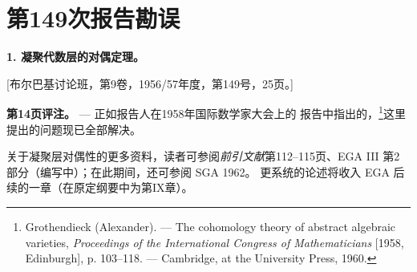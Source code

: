 \clearpage
\chapter*{第149次报告勘误}
\setcounter{footnote}{0}

\noindent\textbf{1. 凝聚代数层的对偶定理。}

\begin{center}
[布尔巴基讨论班，第9卷，1956/57年度，第149号，25页。]
\end{center}

\noindent\textbf{第14页评注。} --- 正如报告人在1958年国际数学家大会上的
报告中指出的，\footnote{Grothendieck (Alexander). --- The cohomology
theory of abstract algebraic varieties, \emph{Proceedings of the
International Congress of Mathematicians} [1958, Edinburgh], p. 103--118.
--- Cambridge, at the University Press, 1960.}这里提出的问题现已全部解决。

关于凝聚层对偶性的更多资料，读者可参阅\emph{前引文献}\footnotemark[1]
第112--115页、EGA III 第2部分（编写中）；在此期间，还可参阅 SGA 1962。
更系统的论述将收入 EGA 后续的一章（在原定纲要中为第IX章）。
